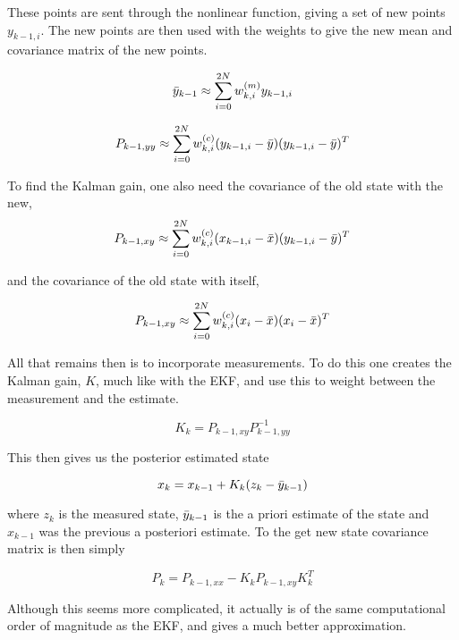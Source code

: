 These points are sent through the nonlinear function, giving a set of new points $y_{k-1,i}$. The new points are then used with the weights to give the new mean and covariance matrix of the new points. 


\begin{equation}
    \Bar{y}_{k-1} \approx \sum_{i=0}^{2N} w_{k,i}^{(m)}y_{k-1,i}
\end{equation}

\begin{equation}
    P_{k-1, yy} \approx \sum_{i=0}^{2N} w_{k,i}^{(c)}(y_{k-1,i} - \Bar{y})(y_{k-1,i} - \Bar{y})^T
\end{equation}

To find the Kalman gain, one also need the covariance of the old state with the new, 
\begin{equation}
    P_{k-1, xy} \approx \sum_{i=0}^{2N} w_{k,i}^{(c)}(x_{k-1,i} - \Bar{x})(y_{k-1,i} - \Bar{y})^T
\end{equation}

and the covariance of the old state with itself,

\begin{equation}
    P_{k-1,xy} \approx \sum_{i=0}^{2N}w_{k,i}^{(c)}(x_i - \Bar{x})(x_i - \Bar{x})^T
\end{equation}

All that remains then is to incorporate measurements. To do this one creates the Kalman gain, $K$, much like with the EKF, and use this to weight between the measurement and the estimate.

\begin{equation}
    K_k = P_{k-1,xy}P_{k-1,yy}^{-1}
\end{equation}

This then gives us the posterior estimated state

\begin{equation}
    x_k = x_{k-1} + K_k(z_k - \Bar{y}_{k-1})
\end{equation}

where $z_k$ is the measured state, $\Bar{y}_{k-1}$ is the a priori estimate of the state and $x_{k-1}$ was the previous a posteriori estimate. To the get new state covariance matrix is then simply

\begin{equation}
    P_k = P_{k-1,xx} - K_kP_{k-1,xy}K_k^T
\end{equation}

Although this seems more complicated, it actually is of the same computational order of magnitude as the EKF, and gives a much better approximation.



